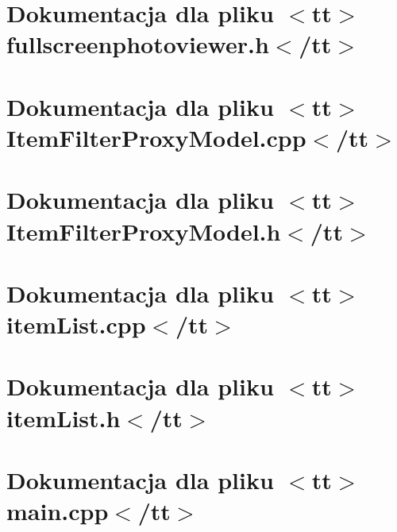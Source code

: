 \documentclass[twoside]{book}
\newcommand{\+}{\discretionary{\mbox{\scriptsize$\hookleftarrow$}}{}{}}
\begin{document}
\chapter{Dokumentacja dla pliku \texorpdfstring{$<$}{<}tt\texorpdfstring{$>$}{>}fullscreenphotoviewer.\+h\texorpdfstring{$<$}{<}/tt\texorpdfstring{$>$}{>}}
\label{md_documentation_fullscreenphotoviewer_h}

\chapter{Dokumentacja dla pliku \texorpdfstring{$<$}{<}tt\texorpdfstring{$>$}{>}Item\+Filter\+Proxy\+Model.\+cpp\texorpdfstring{$<$}{<}/tt\texorpdfstring{$>$}{>}}
\label{md_documentation__item_filter_proxy_model_cpp}

\chapter{Dokumentacja dla pliku \texorpdfstring{$<$}{<}tt\texorpdfstring{$>$}{>}Item\+Filter\+Proxy\+Model.\+h\texorpdfstring{$<$}{<}/tt\texorpdfstring{$>$}{>}}
\label{md_documentation__item_filter_proxy_model_h}

\chapter{Dokumentacja dla pliku \texorpdfstring{$<$}{<}tt\texorpdfstring{$>$}{>}item\+List.\+cpp\texorpdfstring{$<$}{<}/tt\texorpdfstring{$>$}{>}}
\label{md_documentation_item_list_cpp}

\chapter{Dokumentacja dla pliku \texorpdfstring{$<$}{<}tt\texorpdfstring{$>$}{>}item\+List.\+h\texorpdfstring{$<$}{<}/tt\texorpdfstring{$>$}{>}}
\label{md_documentation_item_list_h}

\chapter{Dokumentacja dla pliku \texorpdfstring{$<$}{<}tt\texorpdfstring{$>$}{>}main.\+cpp\texorpdfstring{$<$}{<}/tt\texorpdfstring{$>$}{>}}
\label{md_documentation_main}

\end{document}
